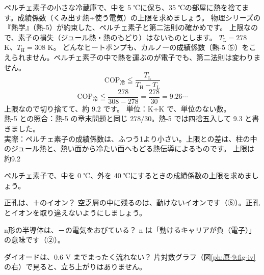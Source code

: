 \label{ph:原-9:ex13}
\begin{phreidai}[ペルチェ素子の冷蔵庫の上限]
ペルチェ素子の小さな冷蔵庫で、中を 5 ℃に保ち、35 ℃の部屋に熱を捨てます。成績係数（くみ出す熱÷使う電気）の上限を求めましょう。
\phbamen
物理シリーズの『熱学』（熱-5）が約束した、ペルチェ素子と第二法則の確かめです。
\phmushi
上限なので、素子の損失（ジュール熱・熱のもどり）はないものとします。
\phzu
$T_{\mathrm L}=278$ K、$T_{\mathrm H}=308$ K。
\phriyu
どんなヒートポンプも、カルノーの成績係数（熱-5 ⑤）をこえられません。ペルチェ素子の中で熱を運ぶのが電子でも、第二法則は変わりません。
\phtateru
\[ \mathrm{COP}_{\text{冷}}\leqq\frac{T_{\mathrm L}}{T_{\mathrm H}-T_{\mathrm L}} \]
\phtoku
\[ \mathrm{COP}_{\text{冷}}\leqq\frac{278}{308-278}=\frac{278}{30}=9.26\cdots \]
上限なので切り捨てて、約 9.2 です。
\phtashikame
単位：K÷K で、単位のない数。\\
熱-5 との照合：熱-5 の章末問題と同じ $278/30$。熱-5 では四捨五入して 9.3 と書きました。\\
実際：ペルチェ素子の成績係数は、ふつう1より小さい。上限との差は、柱の中のジュール熱と、熱い面から冷たい面へもどる熱伝導によるものです。
\kotae 上限は約9.2
\end{phreidai}
\begin{jibun}
ペルチェ素子で、中を 0 ℃、外を 40 ℃にするときの成績係数の上限を求めましょう。
\end{jibun}

\begin{tsumazuki}{正孔は、＋のイオン？}
空乏層の中に残るのは、動けないイオンです（⑥）。正孔とイオンを取り違えないようにしましょう。
\end{tsumazuki}

\begin{tsumazuki}{n形の半導体は、－の電気をおびている？}
n は「動けるキャリアが負（電子）」の意味です（②）。
\end{tsumazuki}

\begin{tsumazuki}{ダイオードは、0.6 V までまったく流れない？}
片対数グラフ（図\ref{ph:原-9:fig-iv}の右）で見ると、立ち上がりはありません。
\end{tsumazuki}

